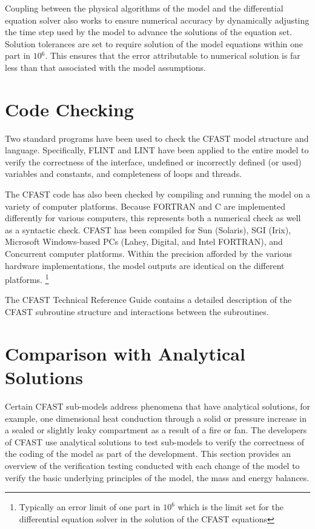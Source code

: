 Coupling between the physical algorithms of the model and the differential equation solver also works to ensure numerical accuracy by dynamically adjusting the time step used by the model to advance the solutions of the equation set. Solution tolerances are set to require solution of the model equations within one part in $10{^6}$. This ensures that the error attributable to numerical solution is far less than that associated with the model assumptions.

\section{Code Checking}
Two standard programs have been used to check the CFAST model structure and language.  Specifically, FLINT and LINT have been applied to the entire model to verify the correctness of the interface, undefined or incorrectly defined (or used) variables and constants, and completeness of loops and threads.

The CFAST code has also been checked by compiling and running the model on a variety of computer platforms.  Because FORTRAN and C are implemented differently for various computers, this represents both a numerical check as well as a syntactic check.  CFAST has been compiled for Sun (Solaris), SGI (Irix), Microsoft Windows-based PCs (Lahey, Digital, and Intel FORTRAN), and Concurrent computer platforms.  Within the precision afforded by the various hardware implementations, the model outputs are identical on the different platforms. \footnote{Typically an error limit of one part in $10^6$ which is the limit set for the differential equation solver in the solution of the CFAST equations}

The CFAST Technical Reference Guide \cite{CFAST_Tech_Guide_6} contains a detailed description of the CFAST subroutine structure and interactions between the subroutines.

\section{Comparison with Analytical Solutions}

Certain CFAST sub-models address phenomena that have analytical solutions, for example, one dimensional heat conduction through a solid or pressure increase in a sealed or slightly leaky compartment as a result of a fire or fan.  The developers of CFAST use analytical solutions to test sub-models to verify the correctness of the coding of the model as part of the development. This section provides an overview of the verification testing conducted with each change of the model to verify the basic underlying principles of the model, the mass and energy balances.

